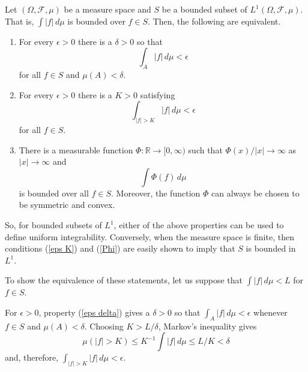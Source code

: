 \documentclass[12pt]{article}
\begin{document}

Let $(\Omega,\mathcal{F},\mu)$ be a measure space and $S$ be a bounded subset of $L^1(\Omega,\mathcal{F},\mu)$. That is, $\int|f|\,d\mu$ is bounded over $f\in S$. Then, the following are equivalent.

\begin{enumerate}
\item\label{eps delta} For every $\epsilon>0$ there is a $\delta>0$ so that
\begin{equation*}
\int_A |f|\,d\mu<\epsilon
\end{equation*}
for all $f\in S$ and $\mu(A)<\delta$.
\item\label{eps K} For every $\epsilon>0$ there is a $K>0$ satisfying
\begin{equation*}
\int_{|f|>K} |f|\,d\mu<\epsilon
\end{equation*}
for all $f\in S$.
\item\label{Phi} There is a measurable function $\Phi\colon\mathbb{R}\rightarrow [0,\infty)$ such that $\Phi(x)/|x|\rightarrow\infty$ as $|x|\rightarrow\infty$ and
\begin{equation*}
\int \Phi(f)\,d\mu
\end{equation*}
is bounded over all $f\in S$. Moreover, the function $\Phi$ can always be chosen to be symmetric and convex.
\end{enumerate}

So, for bounded subsets of $L^1$, either of the above properties can be used to define uniform integrability. Conversely, when the measure space is finite, then conditions (\ref{eps K}) and (\ref{Phi}) are easily shown to imply that $S$ is bounded in $L^1$.


To show the equivalence of these statements, let us suppose that $\int|f|\,d\mu< L$ for $f\in S$.

\vspace{\baselineskip}

For $\epsilon>0$, property (\ref{eps delta}) gives a $\delta>0$ so that $\int_A|f|\,d\mu<\epsilon$ whenever $f\in S$ and $\mu(A)<\delta$. Choosing $K>L/\delta$, Markov's inequality gives
\begin{equation*}
\mu(|f|>K)\le K^{-1}\int|f|\,d\mu\le L/K<\delta
\end{equation*}
and, therefore, $\int_{|f|>K}|f|\,d\mu<\epsilon$.
\end{document}
